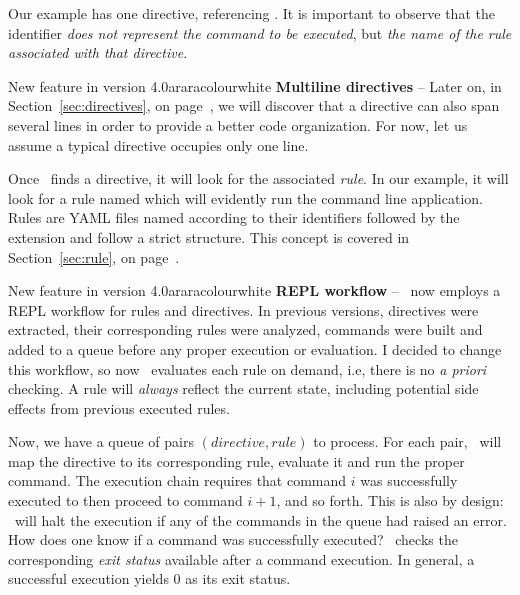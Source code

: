 Our example has one directive, referencing . It is important to observe that the  identifier \emph{does not represent the command to be executed}, but \emph{the name of the rule associated with that directive}.

\begin{messagebox}{New feature in version 4.0}{araracolour}{\icinfo}{white}
\textbf{Multiline directives} -- Later on, in Section~\ref{sec:directives}, on page~\pageref{sec:directives}, we will discover that a directive can also span several lines in order to provide a better code organization. For now, let us assume a typical directive occupies only one line.
\end{messagebox}

Once \arara\ finds a directive, it will look for the associated \emph{rule}. In our example, it will look for a rule named  which will evidently run the  command line application. Rules are \gls{YAML} files named according to their identifiers followed by the  extension and follow a strict structure. This concept is covered in Section~\ref{sec:rule}, on page~\pageref{sec:rule}.

\begin{messagebox}{New feature in version 4.0}{araracolour}{\icattention}{white}
\textbf{\gls{REPL} workflow} -- \arara\ now employs a \gls{REPL} workflow for rules and directives. In previous versions, directives were extracted, their corresponding rules were analyzed, commands were built and added to a queue before any proper execution or evaluation. I decided to change this workflow, so now \arara\ evaluates each rule on demand, i.e, there is no \emph{a priori} checking. A rule will \emph{always} reflect the current state, including potential side effects from previous executed rules.
\end{messagebox}

Now, we have a queue of pairs $(\textit{directive}, \textit{rule})$ to process. For each pair, \arara\ will map the directive to its corresponding rule, evaluate it and run the proper command. The execution chain requires that command $i$ was successfully executed to then proceed to command $i+1$, and so forth. This is also by design: \arara\ will halt the execution if any of the commands in the queue had raised an error. How does one know if a command was successfully executed? \arara\ checks the corresponding \emph{exit status} available after a command execution. In general, a successful execution yields 0 as its exit status.

